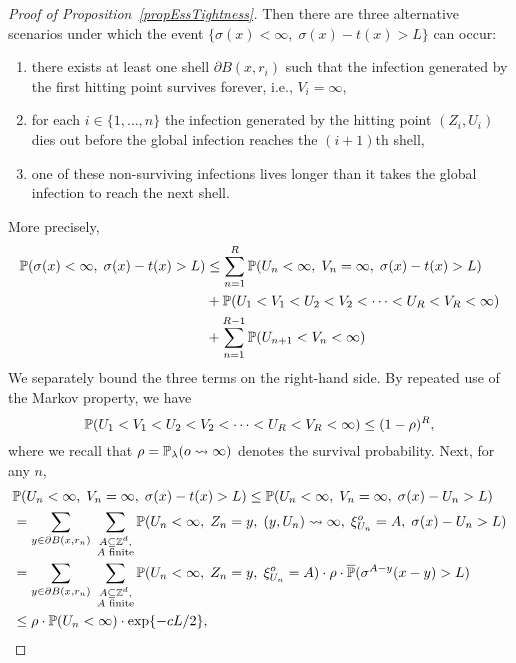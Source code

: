 \begin{proof}[Proof of Proposition~\ref{propEssTightness}]
	Then there are three alternative scenarios under which the event $\{\sigma(x) < \infty,\;\sigma(x) - t(x) > L\}$ can occur: 
	\begin{enumerate}
		\item there exists at least one shell $\partial B(x, r_i)$ such that the infection generated by the first hitting point survives forever, i.e., $V_i = \infty$,
		\item for each $i \in \{1,\ldots, n\}$ the infection generated by the hitting point $(Z_i, U_i)$ dies out before the global infection reaches the $(i+1)$th shell, 
		\item one of these non-surviving infections lives longer than it takes the global infection to reach the next shell.
	\end{enumerate}
	More precisely,
\begin{equation}\label{eq:3terms}\begin{split}
\P(\sigma(x) < \infty,\; \sigma(x) - t(x) > L) &\leq \sum_{n=1}^R\P(U_n < \infty,\; V_n = \infty,\; \sigma(x) - t(x) > L) \\&+
 \P(U_1 < V_1 < U_2 < V_2 <\cdots < U_R < V_R < \infty)\\&
	+ \sum_{n=1}^{R-1} \P(U_{n+1} < V_{n} <\infty)
\end{split}\end{equation}
	We separately bound the three terms on the right-hand side. By repeated use of the Markov property, we have 
	\begin{equation}\P(U_1 < V_1 < U_2 < V_2 <\cdots < U_R < V_R < \infty)\leq(1-\rho)^R, \label{eq:first_ing}\end{equation} 
		where we recall that $\rho = \P_\lambda(o \rightsquigarrow \infty)$  denotes the survival probability. Next, for any $n$,
\begin{align}
&\P(U_n < \infty,\; V_n = \infty,\;\sigma(x) - t(x) > L) \leq \P(U_n < \infty,\;V_n = \infty,\;\sigma(x) - U_n > L) \nonumber\\
&=\sum_{y \in \partial B(x,r_n)}\; \sum_{\substack{A \subseteq \Zd,\\A\text{ finite}}} \P(U_n < \infty,\; Z_n = y,\; (y, U_n) \rightsquigarrow \infty,\; \xi^o_{U_n} = A,\; \sigma(x) - U_n > L)\nonumber\\
&= \sum_{y \in \partial B(x,r_n)}\; \sum_{\substack{A \subseteq \Zd,\\A \text{ finite}}} \P(U_n < \infty,\; Z_n = y,\;  \xi^o_{U_n} = A) \cdot \rho\cdot \oP(\sigma^{A-y}(x-y) > L)\nonumber\\
&\leq \rho \cdot \P(U_n < \infty) \cdot \exp\{-cL/2\},\label{eq:second_ing}

\end{align}
\end{proof}
